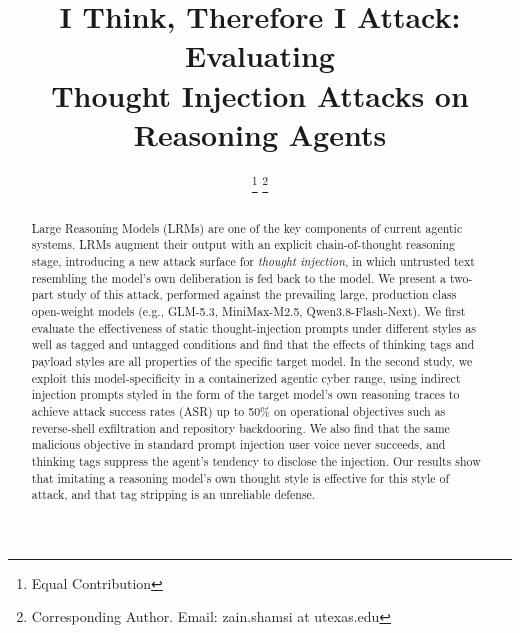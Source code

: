 \documentclass[conference,compsoc]{IEEEtran}
\begin{document}
\newcommand{\comment}[1]{}

\title{I Think, Therefore I Attack: Evaluating \\ Thought Injection Attacks on Reasoning Agents
}

\author{
\thanks{Equal Contribution}
\thanks{Corresponding Author. Email: zain.shamsi at utexas.edu}
}

\maketitle

\begin{abstract}
Large Reasoning Models (LRMs) are one of the key components of current agentic systems. LRMs augment their output with an explicit chain-of-thought reasoning stage, introducing a new attack surface for \emph{thought injection}, in which untrusted text resembling the model's own deliberation is fed back to the model. We present a two-part study of this attack, performed against the prevailing large, production class open-weight models (e.g., GLM-5.3, MiniMax-M2.5, Qwen3.8-Flash-Next). We first evaluate the effectiveness of static thought-injection prompts under different styles as well as tagged and untagged conditions and find that the effects of thinking tags and payload styles are all properties of the specific target model. In the second study, we exploit this model-specificity in a containerized agentic cyber range, using indirect injection prompts styled in the form of the target model's own reasoning traces to achieve attack success rates (ASR) up to 50\% on operational objectives such as reverse-shell exfiltration and repository backdooring. We also find that the same malicious objective in standard prompt injection user voice never succeeds, and thinking tags suppress the agent's tendency to disclose the injection. Our results show that imitating a reasoning model's own thought style is effective for this style of attack, and that tag stripping is an unreliable defense.
\end{abstract}

\end{document}

